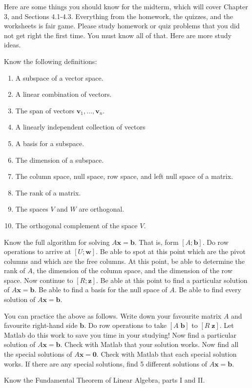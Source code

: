 \documentclass[minion]{homework}
\newcommand{\vb}{\mathbf{b}}
\newcommand{\vx}{\mathbf{x}}
\newcommand{\vz}{\mathbf{z}}
\newcommand{\vv}{\mathbf{v}}
\newcommand{\vzero}{\mathbf{0}}
\newcommand{\vw}{\mathbf{w}}
\begin{document}
Here are some things you should know for the midterm, which will cover 
Chapter 3, and Sections 4.1-4.3. Everything from the homework, the quizzes, and the worksheets is fair game.  Please study homework or quiz problems that you did not get right the first time. You must know all of that.  Here are more study ideas.

Know the following definitions:
\begin{enumerate}
	\item A subspace of a vector space.
	\item A linear combination of vectors.
	\item The span of vectors $\vv_1,\ldots,\vv_n$.
	\item A linearly independent collection of vectors
	\item A basis for a subspace.
	\item The dimension of a subspace.
	\item The column space, null space, row space, and left null space of a matrix.
	\item The rank of a matrix.
	\item The spaces $V$ and $W$ are orthogonal.
	\item The orthogonal complement of the space $V$.
\end{enumerate}

Know the full algorithm for solving $A\vx = \vb$.  That is, 
form $[A;\vb]$.  Do row operations to arrive at $[U;\vw]$.
Be able to spot at this point which are the pivot columns and which
are the free columns.  At this point, be able to determine the
rank of $A$, the dimension of the column space, and the dimension of the row
space.  Now continue to $[R;\vz]$.  Be able at this point 
to find a particular solution of $A\vx = \vb$.  Be able to find
a basis for the null space of $A$.  Be able to find every solution
of $A\vx = \vb$.

You can practice the above as follows.
Write down your favourite matrix $A$ and favourite right-hand side $\vb$.
Do row operations to take $[A\;\vb]$ to $[R\;\vz]$.  Let Matlab do this work
to save you time in your studying!  Now find a particular solution of $A\vx=\vb$.  Check with Matlab that your solution works.  Now find all the
special solutions of $A\vx=\vzero$.  Check with Matlab that each special solution works.  If there are any special solutions, find 5 different solutions of $A\vx=\vb$.

Know the Fundamental Theorem of Linear Algebra, parts I and II.
\end{document}
